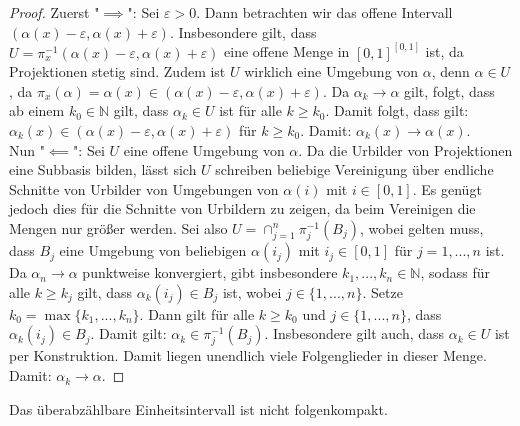 \documentclass[11pt]{scrartcl}
\newcommand{\N}{\mathbb{N}}
\begin{document}
\begin{proof}
	Zuerst "$\implies$": Sei $\varepsilon >0$. Dann betrachten wir das offene Intervall $(\alpha(x)-\varepsilon, \alpha(x)+\varepsilon)$. Insbesondere gilt, 
	dass $U=\pi_{x}^{-1}(\alpha(x)-\varepsilon,\alpha(x)+\varepsilon)$ eine offene Menge in $[0,1]^{[0,1]}$ ist, da Projektionen stetig sind. Zudem ist $U$ wirklich eine Umgebung von $\alpha$, 
	denn $\alpha\in U$, da $\pi_x(\alpha)=\alpha(x)\in (\alpha(x)-\varepsilon,\alpha(x)+\varepsilon)$.
	Da $\alpha_k\rightarrow \alpha$ gilt, folgt, dass 
	ab einem $k_0\in\N$ gilt, dass $\alpha_k\in U$ ist für alle $k\geq k_0$. Damit folgt, dass gilt: $\alpha_k(x)\in (\alpha(x)-\varepsilon, \alpha(x)+\varepsilon)$ für $k \geq k_0$. 
	Damit: $\alpha_k(x)\rightarrow \alpha(x)$.\\
	Nun "$\impliedby$": Sei $U$ eine offene Umgebung von $\alpha$. Da die Urbilder von Projektionen eine Subbasis bilden, lässt sich $U$ schreiben beliebige Vereinigung über endliche Schnitte von Urbilder 
	von Umgebungen von $\alpha(i)$ mit $i\in [0,1]$. Es genügt jedoch dies für die Schnitte von Urbildern zu zeigen, da beim Vereinigen die Mengen nur größer werden. Sei also  $U=\cap_{j=1}^n 
	\pi_j^{-1}(B_j)$, wobei gelten muss, dass $B_j$ eine Umgebung von beliebigen $\alpha(i_j)$ mit $i_j\in [0,1]$ für $j=1,...,n$ ist. Da $\alpha_n\rightarrow \alpha$ punktweise konvergiert, gibt
	insbesondere $k_1,...,k_n\in\N$, sodass für alle $k \geq k_j$ gilt, dass $\alpha_k(i_j) \in B_j$ ist, wobei 
	$j\in \{1,...,n\}$. Setze $k_0=\max\{k_1,...,k_n\}$. Dann gilt für alle $k\geq k_0$ und $j \in \{1,...,n\}$, dass $\alpha_k(i_j) \in B_j$. Damit gilt: $\alpha_k\in \pi_j^{-1}(B_j)$. Insbesondere
	gilt auch, dass $\alpha_k \in U$ ist per Konstruktion. Damit liegen unendlich viele Folgenglieder in dieser Menge. Damit: $\alpha_k\rightarrow \alpha$.
\end{proof}
\begin{theorem}
	Das überabzählbare Einheitsintervall ist nicht folgenkompakt.
\end{theorem}
\end{document}
